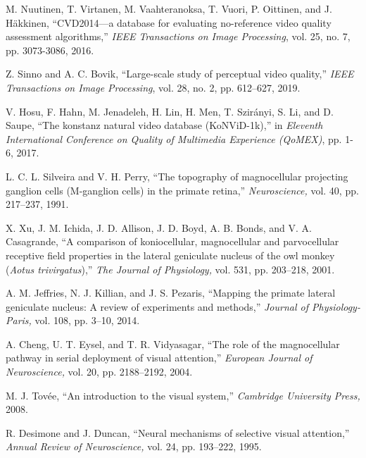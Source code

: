 \documentclass[journal]{IEEEtran}
\begin{document}
\begin{thebibliography}{5}
M. Nuutinen, T. Virtanen, M. Vaahteranoksa, T. Vuori, P. Oittinen, and J. H\"akkinen, ``CVD2014—a database for evaluating no-reference video quality assessment algorithms,'' \emph{IEEE Transactions on Image Processing}, vol. 25, no. 7, pp. 3073-3086, 2016.

Z. Sinno and A. C. Bovik, ``Large-scale study of perceptual video quality,'' \emph{IEEE Transactions on Image Processing}, vol. 28, no. 2, pp. 612–627, 2019.

V. Hosu, F. Hahn, M. Jenadeleh, H. Lin, H. Men, T. Szir\'anyi, S. Li, and D. Saupe, ``The konstanz natural video database (KoNViD-1k),'' in \emph{Eleventh International Conference on Quality of Multimedia Experience (QoMEX)}, pp. 1-6, 2017.



















L. C. L. Silveira and V. H. Perry, ``The topography of magnocellular projecting ganglion cells (M-ganglion cells) in the primate retina,'' \emph{Neuroscience,} vol. 40, pp. 217–237, 1991.

X. Xu, J. M. Ichida, J. D. Allison, J. D. Boyd, A. B. Bonds, and V. A. Casagrande, ``A comparison of koniocellular, magnocellular and parvocellular receptive field properties in the lateral geniculate nucleus of the owl monkey (\emph{Aotus trivirgatus}),'' \emph{The Journal of Physiology,} vol. 531, pp. 203–218, 2001.

A. M. Jeffries, N. J. Killian, and J. S. Pezaris, ``Mapping the primate lateral geniculate nucleus: A review of experiments and methods,'' \emph{Journal of Physiology-Paris,} vol. 108, pp. 3–10, 2014.

A. Cheng, U. T. Eysel, and T. R. Vidyasagar, ``The role of the magnocellular pathway in serial deployment of visual attention,'' \emph{European Journal of Neuroscience,} vol. 20, pp. 2188–2192, 2004.

M. J. Tov\'{e}e, ``An introduction to the visual system,'' \emph{Cambridge University Press,} 2008.

R. Desimone and J. Duncan, ``Neural mechanisms of selective visual attention,'' \emph{Annual Review of Neuroscience,} vol. 24, pp. 193–222, 1995.


\end{thebibliography}
\end{document}

